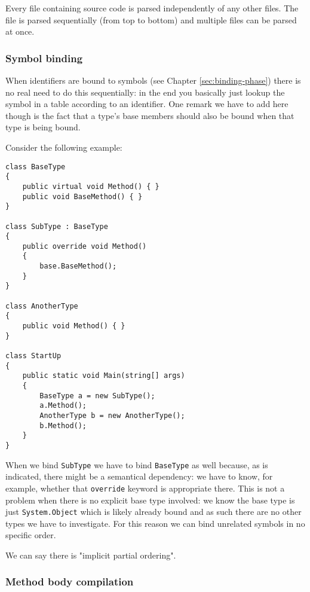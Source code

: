 Every file containing source code is parsed independently of any other files. The file is parsed sequentially (from top to bottom) and multiple files can be parsed at once.\cite{Sadov2014}

\subsubsection{Symbol binding }
\label{sec:concur-symbol-binding}

When identifiers are bound to symbols (see Chapter \ref{sec:binding-phase}) there is no real need to do this sequentially: in the end you basically just lookup the symbol in a table according to an identifier. One remark we have to add here though is the fact that a type's base members should also be bound when that type is being bound.

Consider the following example:

\begin{lstlisting}
class BaseType
{
	public virtual void Method() { }
	public void BaseMethod() { }	
}

class SubType : BaseType
{
	public override void Method()
	{
		base.BaseMethod();
	}
}

class AnotherType
{
	public void Method() { }
}

class StartUp 
{
	public static void Main(string[] args)
	{
		BaseType a = new SubType();
		a.Method();
		AnotherType b = new AnotherType();
		b.Method();
	}
}
\end{lstlisting}

When we bind \verb|SubType| we have to bind \verb|BaseType| as well because, as is indicated, there might be a semantical dependency: we have to know, for example, whether that \verb|override| keyword is appropriate there. This is not a problem when there is no explicit base type involved: we know the base type is just \verb|System.Object| which is likely already bound and as such there are no other types we have to investigate. For this reason we can bind unrelated symbols in no specific order.

\noindent We can say there is "implicit partial ordering".\cite{Sadov2014}

\subsubsection{Method body compilation }
\label{sec:concur-symbol-binding}

